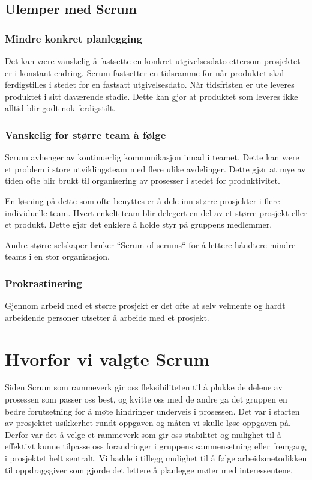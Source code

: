 \subsection{\textbf{Ulemper med Scrum}}

\subsubsection{\textbf{Mindre konkret planlegging}}
Det kan være vanskelig å fastsette en konkret utgivelsesdato ettersom prosjektet er i konstant endring. Scrum fastsetter en tidsramme for når produktet skal ferdigstilles i stedet for en fastsatt utgivelsesdato. Når tidsfristen er ute leveres produktet i sitt daværende stadie. Dette kan gjør at produktet som leveres ikke alltid blir godt nok ferdigstilt. 

\subsubsection{\textbf{Vanskelig for større team å følge}}
Scrum avhenger av kontinuerlig kommunikasjon innad i teamet. Dette kan være et problem i store utviklingsteam med flere ulike avdelinger. Dette gjør at mye av tiden ofte blir brukt til organisering av prosesser i stedet for produktivitet. 

En løsning på dette som ofte benyttes er å dele inn større prosjekter i flere individuelle team. Hvert enkelt team blir delegert en del av et større prosjekt eller et produkt. Dette gjør det enklere å holde styr på gruppens medlemmer.

Andre større selskaper bruker ``Scrum of scrums`` for å lettere håndtere mindre teams i en stor organisasjon.

\subsubsection{\textbf{Prokrastinering}}
Gjennom arbeid med et større prosjekt er det ofte at selv velmente og hardt arbeidende personer utsetter å arbeide med et prosjekt. 

\section{\textbf{Hvorfor vi valgte Scrum}}
Siden Scrum som rammeverk gir oss fleksibiliteten til å plukke de delene av prosessen som passer oss best, og kvitte oss med de andre ga det gruppen en bedre forutsetning for å møte hindringer underveis i prosessen. Det var i starten av prosjektet usikkerhet rundt oppgaven og måten vi skulle løse oppgaven på. Derfor var det å velge et rammeverk som gir oss stabilitet og mulighet til å effektivt kunne tilpasse oss forandringer i gruppens sammensetning eller fremgang i prosjektet helt sentralt. Vi hadde i tillegg mulighet til å følge arbeidsmetodikken til oppdragsgiver som gjorde det lettere å planlegge møter med interessentene. 

